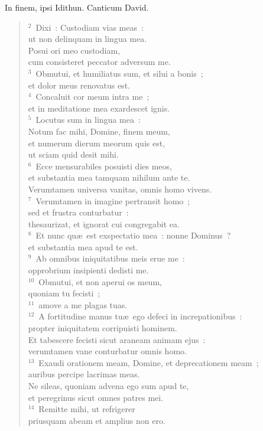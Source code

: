 \bchapter
\lettrine[lines=3,image=true,loversize=0.05,lraise=-0.03]{I}{}n finem, ipsi Idithun. Canticum David.
\begin{flushleft}\begin{verse}\vspace{6pt}${}^{2}$~Dixi~: Custodiam vias meas~:\\ ut non delinquam in lingua mea.\\ Posui ori meo custodiam,\\ cum consisteret peccator adversum me.\\
${}^{3}$~Obmutui, et humiliatus sum, et silui a bonis~;\\ et dolor meus renovatus est.\\
${}^{4}$~Concaluit cor meum intra me~;\\ et in meditatione mea exardescet ignis.\\
${}^{5}$~Locutus sum in lingua mea~:\\ Notum fac mihi, Domine, finem meum,\\ et numerum dierum meorum quis est,\\ ut sciam quid desit mihi.\\
${}^{6}$~Ecce mensurabiles posuisti dies meos,\\ et substantia mea tamquam nihilum ante te.\\ Verumtamen universa vanitas, omnis homo vivens.\\
${}^{7}$~Verumtamen in imagine pertransit homo~;\\ sed et frustra conturbatur~:\\ thesaurizat, et ignorat cui congregabit ea.\\
${}^{8}$~Et nunc qu\ae\ est exspectatio mea~: nonne Dominus~?\\ et substantia mea apud te est.\\
${}^{9}$~Ab omnibus iniquitatibus meis erue me~:\\ opprobrium insipienti dedisti me.\\
${}^{10}$~Obmutui, et non aperui os meum,\\ quoniam tu fecisti~;\\
${}^{11}$~amove a me plagas tuas.\\
${}^{12}$~A fortitudine manus tu\ae\ ego defeci in increpationibus~:\\ propter iniquitatem corripuisti hominem.\\ Et tabescere fecisti sicut araneam animam ejus~:\\ verumtamen vane conturbatur omnis homo.\\
${}^{13}$~Exaudi orationem meam, Domine, et deprecationem meam~;\\ auribus percipe lacrimas meas.\\ Ne sileas, quoniam advena ego sum apud te,\\ et peregrinus sicut omnes patres mei.\\
${}^{14}$~Remitte mihi, ut refrigerer\\ priusquam abeam et amplius non ero.\end{verse}\end{flushleft}



